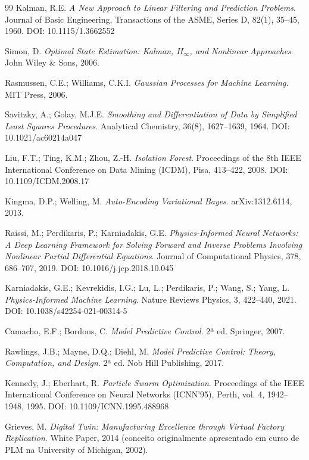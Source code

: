 \documentclass[12pt,a4paper]{article}
\numberwithin{equation}{section}
\numberwithin{table}{section}
\numberwithin{figure}{section}
\begin{document}
\begin{thebibliography}{99}
 Kalman, R.E. \textit{A New Approach to Linear Filtering and Prediction Problems}. Journal of Basic Engineering, Transactions of the ASME, Series D, 82(1), 35–45, 1960. DOI: 10.1115/1.3662552

 Simon, D. \textit{Optimal State Estimation: Kalman, $H_\infty$, and Nonlinear Approaches}. John Wiley \& Sons, 2006.

 Rasmussen, C.E.; Williams, C.K.I. \textit{Gaussian Processes for Machine Learning}. MIT Press, 2006.

 Savitzky, A.; Golay, M.J.E. \textit{Smoothing and Differentiation of Data by Simplified Least Squares Procedures}. Analytical Chemistry, 36(8), 1627–1639, 1964. DOI: 10.1021/ac60214a047

 Liu, F.T.; Ting, K.M.; Zhou, Z.-H. \textit{Isolation Forest}. Proceedings of the 8th IEEE International Conference on Data Mining (ICDM), Pisa, 413–422, 2008. DOI: 10.1109/ICDM.2008.17

 Kingma, D.P.; Welling, M. \textit{Auto-Encoding Variational Bayes}. arXiv:1312.6114, 2013.

 Raissi, M.; Perdikaris, P.; Karniadakis, G.E. \textit{Physics-Informed Neural Networks: A Deep Learning Framework for Solving Forward and Inverse Problems Involving Nonlinear Partial Differential Equations}. Journal of Computational Physics, 378, 686–707, 2019. DOI: 10.1016/j.jcp.2018.10.045

 Karniadakis, G.E.; Kevrekidis, I.G.; Lu, L.; Perdikaris, P.; Wang, S.; Yang, L. \textit{Physics-Informed Machine Learning}. Nature Reviews Physics, 3, 422–440, 2021. DOI: 10.1038/s42254-021-00314-5

 Camacho, E.F.; Bordons, C. \textit{Model Predictive Control}. 2ª ed. Springer, 2007.

 Rawlings, J.B.; Mayne, D.Q.; Diehl, M. \textit{Model Predictive Control: Theory, Computation, and Design}. 2ª ed. Nob Hill Publishing, 2017.

 Kennedy, J.; Eberhart, R. \textit{Particle Swarm Optimization}. Proceedings of the IEEE International Conference on Neural Networks (ICNN'95), Perth, vol. 4, 1942–1948, 1995. DOI: 10.1109/ICNN.1995.488968

 Grieves, M. \textit{Digital Twin: Manufacturing Excellence through Virtual Factory Replication}. White Paper, 2014 (conceito originalmente apresentado em curso de PLM na University of Michigan, 2002).


\end{thebibliography}
\end{document}
